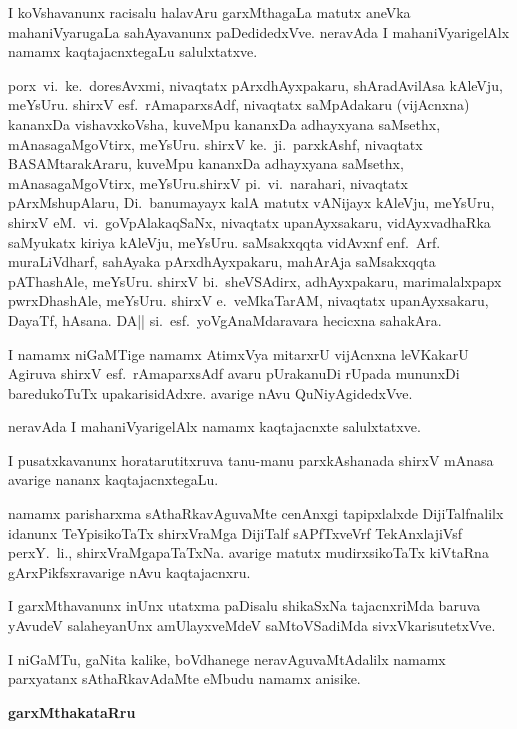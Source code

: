 I koVshavanunx racisalu halavAru garxMthagaLa matutx aneVka mahaniVyarugaLa sahAyavanunx paDedidedxVve. neravAda I mahaniVyarigelAlx namamx kaqtajacnxtegaLu salulxtatxve.

porx\ vi.~ke.\ doresAvxmi, nivaqtatx pArxdhAyxpakaru, shAradAvilAsa kAleVju, meYsUru. shirxV esf.\ rAmaparxsAdf, nivaqtatx saMpAdakaru (vijAcnxna) kananxDa vishavxkoVsha, kuveMpu kananxDa adhayxyana saMsethx, mAnasagaMgoVtirx, meYsUru. shirxV ke.~ji.\ parxkAshf, nivaqtatx BASAMtarakAraru, kuveMpu kananxDa adhayxyana saMsethx, mAnasagaMgoVtirx, meYsUru.\break shirxV pi.~vi.\ narahari, nivaqtatx pArxMshupAlaru, Di.~banumayayx kalA matutx vANijayx kAleVju, meYsUru, shirxV eM.~vi.\ goVpAlakaqSaNx, nivaqtatx upanAyxsakaru, vidAyxvadhaRka saMyukatx kiriya kAleVju, meYsUru. saMsakxqqta vidAvxnf enf.~Arf. muraLiVdharf, sahAyaka pArxdhAyxpakaru, mahArAja saMsakxqqta pAThashAle, meYsUru. shirxV bi.\ sheVSAdirx, adhAyxpakaru, marimalalxpapx pwrxDhashAle, meYsUru. shirxV e.\ veMkaTarAM, nivaqtatx upanAyxsakaru, DayaTf, hAsana. DA|| si.\ esf.\ yoVgAnaMdaravara hecicxna sahakAra.

I namamx niGaMTige namamx AtimxVya mitarxrU vijAcnxna leVKakarU Agiruva shirxV esf.\ rAmaparxsAdf avaru pUrakanuDi rUpada mununxDi baredukoTuTx upakarisidAdxre. avarige nAvu QuNiyAgidedxVve.

neravAda I mahaniVyarigelAlx namamx kaqtajacnxte salulxtatxve.

I pusatxkavanunx horatarutitxruva tanu-manu parxkAshanada shirxV mAnasa avarige nananx kaqtajacnxtegaLu.

namamx parisharxma sAthaRkavAguvaMte cenAnxgi tapipxlalxde DijiTalfnalilx idanunx TeYpisikoTaTx  shirxVraMga DijiTalf sAPfTxveVrf TekAnxlajiVsf 
perxY.\ li., shirxVraMgapaTaTxNa. avarige matutx mudirxsikoTaTx  kiVtaRna gArxPikfsxravarige nAvu kaqtajacnxru.

I garxMthavanunx inUnx utatxma paDisalu shikaSxNa tajacnxriMda baruva yAvudeV salaheyanUnx amUlayxveMdeV saMtoVSadiMda sivxVkarisutetxVve.

I niGaMTu,  gaNita kalike, boVdhanege neravAguvaMtAdalilx namamx parxyatanx sAthaRkavAdaMte eMbudu namamx anisike.
\vskip 1.5cm

\noindent
{}\hfill {\Large\bf garxMthakataRru}\qquad\qquad\,





